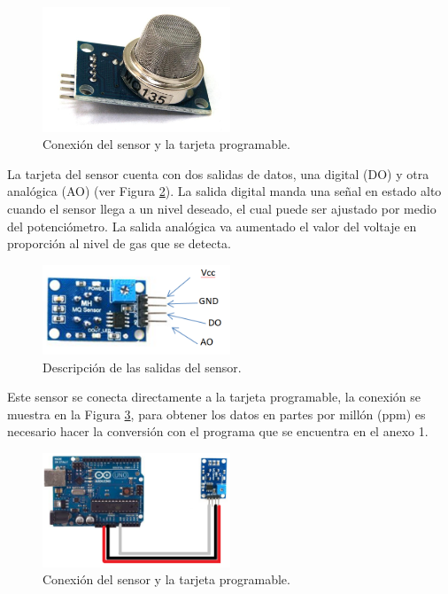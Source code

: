 %
\begin{figure}[H]
\centering
\includegraphics[width=0.5\textwidth]{metodologia/fig_sensor.jpg}
\caption{Conexión del sensor y la tarjeta programable. }
\label{sensor}
\end{figure}
%

La tarjeta del sensor cuenta con dos salidas de datos, una digital (DO) y otra analógica (AO) (ver Figura \ref{descripcion_sensor}). La salida digital manda una señal en estado alto cuando el sensor llega a un nivel deseado, el cual puede ser ajustado por medio del potenciómetro. La salida analógica va aumentado el valor del voltaje en proporción al nivel de gas que se detecta.\\

%
\begin{figure}[H]
\centering
\includegraphics[width=0.5\textwidth]{metodologia/gas_4.png}
\caption{Descripción de las salidas del sensor. }
\label{descripcion_sensor}
\end{figure}
%

Este sensor se conecta directamente a la tarjeta programable, la conexión se muestra en la Figura \ref{conexion_sensor}, para obtener los datos en partes por millón (ppm) es necesario hacer la conversión con el programa que se encuentra en el anexo 1.
%
\begin{figure}[H]
\centering
\includegraphics[width=0.5\textwidth]{metodologia/gas_5.png}
\caption{Conexión del sensor y la tarjeta programable. }
\label{conexion_sensor}
\end{figure}
%


